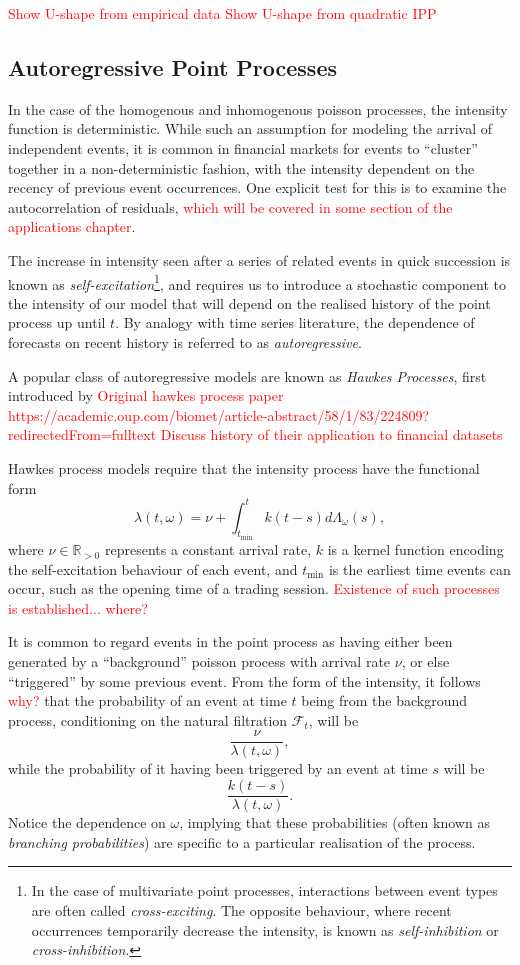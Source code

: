 \documentclass[honours,12pt]{unswthesis}
\numberwithin{equation}{section}
\begin{document}
\textcolor{red}{Show U-shape from empirical data}
\textcolor{red}{Show U-shape from quadratic IPP}

\subsection{Autoregressive Point Processes}
In the case of the homogenous and inhomogenous poisson processes, the intensity function is deterministic. While such an assumption for modeling the arrival of independent events, it is common in financial markets for events to ``cluster'' together in a non-deterministic fashion, with the intensity dependent on the recency of previous event occurrences. One explicit test for this is to examine the autocorrelation of residuals, \textcolor{red}{which will be covered in some section of the applications chapter}.

The increase in intensity seen after a series of related events in quick succession is known as \textit{self-excitation}\footnote{In the case of multivariate point processes, interactions between event types are often called \textit{cross-exciting}. The opposite behaviour, where recent occurrences temporarily decrease the intensity, is known as \textit{self-inhibition} or \textit{cross-inhibition}.}, and requires us to introduce a stochastic component to the intensity of our model that will depend on the realised history of the point process up until $t$. By analogy with time series literature, the dependence of forecasts on recent history is referred to as \textit{autoregressive}.

A popular class of autoregressive models are known as \textit{Hawkes Processes}, first introduced by 
\textcolor{red}{Original hawkes process paper https://academic.oup.com/biomet/article-abstract/58/1/83/224809?redirectedFrom=fulltext}
\textcolor{red}{Discuss history of their application to financial datasets}

Hawkes process models require that the intensity process have the functional form
$$\lambda(t,\omega) = \nu + \int_{t_\mathrm{\min}}^t k(t-s)d\Lambda_\omega(s),$$
where $\nu\in\mathbb{R}_{>0}$ represents a constant arrival rate, $k$ is a kernel function encoding the self-excitation behaviour of each event, and $t_\mathrm{\min}$ is the earliest time events can occur, such as the opening time of a trading session.
\textcolor{red}{Existence of such processes is established... where?}

It is common to regard events in the point process as having either been generated by a ``background'' poisson process with arrival rate $\nu$, or else ``triggered'' by some previous event. From the form of the intensity, it follows \textcolor{red}{why?} that the probability of an event at time $t$ being from the background process, conditioning on the natural filtration $\mathcal{F}_t$, will be
$$\frac{\nu}{\lambda(t,\omega)},$$
while the probability of it having been triggered by an event at time $s$ will be
$$\frac{k(t-s)}{\lambda(t,\omega)}.$$
Notice the dependence on $\omega$, implying that these probabilities (often known as \textit{branching probabilities}) are specific to a particular realisation of the process.
\end{document}
